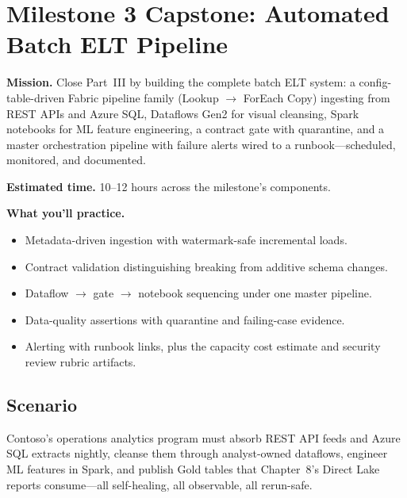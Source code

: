 \section{Milestone 3 Capstone: Automated Batch ELT Pipeline}\label{sec:ch12-capstone}

\begin{capstonebox}
\textbf{Mission.} Close Part~III by building the complete batch ELT system: a config-table-driven Fabric pipeline family (Lookup $\rightarrow$ ForEach Copy) ingesting from REST APIs and Azure SQL, Dataflows Gen2 for visual cleansing, Spark notebooks for ML feature engineering, a contract gate with quarantine, and a master orchestration pipeline with failure alerts wired to a runbook---scheduled, monitored, and documented.

\textbf{Estimated time.} 10--12 hours across the milestone's components.

\textbf{What you'll practice.}
\begin{itemize}
    \item Metadata-driven ingestion with watermark-safe incremental loads.
    \item Contract validation distinguishing breaking from additive schema changes.
    \item Dataflow $\rightarrow$ gate $\rightarrow$ notebook sequencing under one master pipeline.
    \item Data-quality assertions with quarantine and failing-case evidence.
    \item Alerting with runbook links, plus the capacity cost estimate and security review rubric artifacts.
\end{itemize}
\end{capstonebox}

\subsection*{Scenario}
Contoso's operations analytics program must absorb REST API feeds and Azure SQL extracts nightly, cleanse them through analyst-owned dataflows, engineer ML features in Spark, and publish Gold tables that Chapter~8's Direct Lake reports consume---all self-healing, all observable, all rerun-safe.

